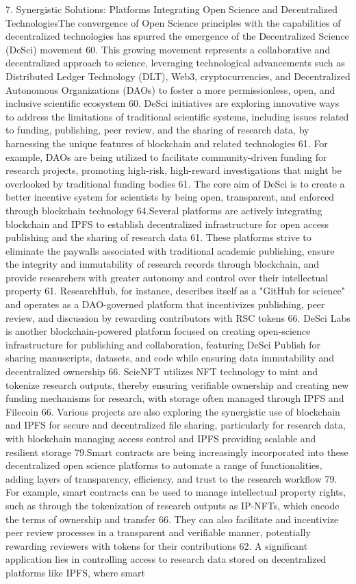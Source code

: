 \documentclass{article}
\begin{document}
7. Synergistic Solutions: Platforms Integrating Open Science and Decentralized TechnologiesThe convergence of Open Science principles with the capabilities of decentralized technologies has spurred the emergence of the Decentralized Science (DeSci) movement 60. This growing movement represents a collaborative and decentralized approach to science, leveraging technological advancements such as Distributed Ledger Technology (DLT), Web3, cryptocurrencies, and Decentralized Autonomous Organizations (DAOs) to foster a more permissionless, open, and inclusive scientific ecosystem 60. DeSci initiatives are exploring innovative ways to address the limitations of traditional scientific systems, including issues related to funding, publishing, peer review, and the sharing of research data, by harnessing the unique features of blockchain and related technologies 61. For example, DAOs are being utilized to facilitate community-driven funding for research projects, promoting high-risk, high-reward investigations that might be overlooked by traditional funding bodies 61. The core aim of DeSci is to create a better incentive system for scientists by being open, transparent, and enforced through blockchain technology 64.Several platforms are actively integrating blockchain and IPFS to establish decentralized infrastructure for open access publishing and the sharing of research data 61. These platforms strive to eliminate the paywalls associated with traditional academic publishing, ensure the integrity and immutability of research records through blockchain, and provide researchers with greater autonomy and control over their intellectual property 61. ResearchHub, for instance, describes itself as a "GitHub for science" and operates as a DAO-governed platform that incentivizes publishing, peer review, and discussion by rewarding contributors with RSC tokens 66. DeSci Labs is another blockchain-powered platform focused on creating open-science infrastructure for publishing and collaboration, featuring DeSci Publish for sharing manuscripts, datasets, and code while ensuring data immutability and decentralized ownership 66. ScieNFT utilizes NFT technology to mint and tokenize research outputs, thereby ensuring verifiable ownership and creating new funding mechanisms for research, with storage often managed through IPFS and Filecoin 66. Various projects are also exploring the synergistic use of blockchain and IPFS for secure and decentralized file sharing, particularly for research data, with blockchain managing access control and IPFS providing scalable and resilient storage 79.Smart contracts are being increasingly incorporated into these decentralized open science platforms to automate a range of functionalities, adding layers of transparency, efficiency, and trust to the research workflow 79. For example, smart contracts can be used to manage intellectual property rights, such as through the tokenization of research outputs as IP-NFTs, which encode the terms of ownership and transfer 66. They can also facilitate and incentivize peer review processes in a transparent and verifiable manner, potentially rewarding reviewers with tokens for their contributions 62. A significant application lies in controlling access to research data stored on decentralized platforms like IPFS, where smart 
\end{document}
